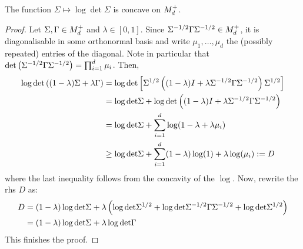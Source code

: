\begin{lemma}
The function $\Sigma \mapsto \log \det \Sigma$ is concave on $M^+_{d}$.
\end{lemma}
\begin{proof}
Let $\Sigma,\Gamma \in M^+_{d}$ and $\lambda \in [0,1]$.  Since $\Sigma^{-1/2}\Gamma\Sigma^{-1/2} \in M^+_{d}$, it is diagonalisable in some orthonormal basis and write $\mu_1,\ldots, \mu_d$ the (possibly repeated) entries of the diagonal. Note in particular that $\mathrm{det} \left( \Sigma^{-1/2}\Gamma\Sigma^{-1/2} \right)=\prod_{i=1}^d \mu_i$. Then,
\begin{align*}
\log \mathrm{det} \left( (1-\lambda)\Sigma+\lambda \Gamma \right)&=\log \mathrm{det} \left[ \Sigma^{1/2} \left( (1-\lambda)I+\lambda \Sigma^{-1/2}\Gamma\Sigma^{-1/2} \right) \Sigma^{1/2} \right]\\
&=\log \mathrm{det} \Sigma + \log \mathrm{det} \left( (1-\lambda)I+\lambda \Sigma^{-1/2}\Gamma\Sigma^{-1/2} \right) \nonumber \\
&=\log \mathrm{det} \Sigma + \sum_{i=1}^d \log(1-\lambda+\lambda \mu_i)\nonumber \\
& \geq \log \mathrm{det} \Sigma + \sum_{i=1}^d (1-\lambda) \log(1)+\lambda \log( \mu_i) \label{eq:diag}:= D
\end{align*}
where the last inequality follows from the concavity of the $\log$. Now, rewrite the rhs $D$ as:
\begin{align*}
D&=(1-\lambda) \log \mathrm{det} \Sigma + \lambda \left( \log \mathrm{det} \Sigma^{1/2}+ \log \mathrm{det} \Sigma^{-1/2}\Gamma\Sigma^{-1/2} + \log \mathrm{det} \Sigma^{1/2} \right) \\
&=(1-\lambda) \log \mathrm{det} \Sigma + \lambda \log \mathrm{det} \Gamma
\end{align*}
This finishes the proof.
\end{proof}







